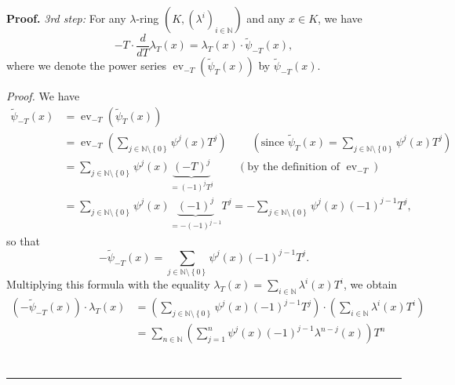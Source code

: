\documentclass[numbers=enddot,12pt,final,onecolumn,notitlepage]{scrartcl}%
\newenvironment{proof}[1][Proof]{\noindent\textbf{#1.} }{\ \rule{0.5em}{0.5em}}
\begin{document}
\begin{proof}
\textit{3rd step:} For any $\lambda$-ring $\left(  K,\left(  \lambda
^{i}\right)  _{i\in\mathbb{N}}\right)  $ and any $x\in K$, we have%
\[
-T\cdot\dfrac{d}{dT}\lambda_{T}\left(  x\right)  =\lambda_{T}\left(  x\right)
\cdot\widetilde{\psi}_{-T}\left(  x\right)  ,
\]
where we denote the power series $\operatorname*{ev}\nolimits_{-T}\left(
\widetilde{\psi}_{T}\left(  x\right)  \right)  $ by $\widetilde{\psi}%
_{-T}\left(  x\right)  $.

\textit{Proof.} We have
\begin{align*}
\widetilde{\psi}_{-T}\left(  x\right)   &  =\operatorname*{ev}\nolimits_{-T}%
\left(  \widetilde{\psi}_{T}\left(  x\right)  \right) \\
&  =\operatorname*{ev}\nolimits_{-T}\left(  \sum\limits_{j\in\mathbb{N}%
\setminus\left\{  0\right\}  }\psi^{j}\left(  x\right)  T^{j}\right)
\ \ \ \ \ \ \ \ \ \ \left(  \text{since }\widetilde{\psi}_{T}\left(  x\right)
=\sum\limits_{j\in\mathbb{N}\setminus\left\{  0\right\}  }\psi^{j}\left(
x\right)  T^{j}\right) \\
&  =\sum\limits_{j\in\mathbb{N}\setminus\left\{  0\right\}  }\psi^{j}\left(
x\right)  \underbrace{\left(  -T\right)  ^{j}}_{=\left(  -1\right)  ^{j}T^{j}%
}\ \ \ \ \ \ \ \ \ \ \left(  \text{by the definition of }\operatorname*{ev}%
\nolimits_{-T}\right) \\
&  =\sum\limits_{j\in\mathbb{N}\setminus\left\{  0\right\}  }\psi^{j}\left(
x\right)  \underbrace{\left(  -1\right)  ^{j}}_{=-\left(  -1\right)  ^{j-1}%
}T^{j}=-\sum\limits_{j\in\mathbb{N}\setminus\left\{  0\right\}  }\psi
^{j}\left(  x\right)  \left(  -1\right)  ^{j-1}T^{j},
\end{align*}
so that%
\[
-\widetilde{\psi}_{-T}\left(  x\right)  =\sum\limits_{j\in\mathbb{N}%
\setminus\left\{  0\right\}  }\psi^{j}\left(  x\right)  \left(  -1\right)
^{j-1}T^{j}.
\]
Multiplying this formula with the equality $\lambda_{T}\left(  x\right)
=\sum\limits_{i\in\mathbb{N}}\lambda^{i}\left(  x\right)  T^{i}$, we obtain%
\begin{align*}
\left(  -\widetilde{\psi}_{-T}\left(  x\right)  \right)  \cdot\lambda
_{T}\left(  x\right)   &  =\left(  \sum\limits_{j\in\mathbb{N}\setminus
\left\{  0\right\}  }\psi^{j}\left(  x\right)  \left(  -1\right)  ^{j-1}%
T^{j}\right)  \cdot\left(  \sum\limits_{i\in\mathbb{N}}\lambda^{i}\left(
x\right)  T^{i}\right) \\
&  =\sum_{n\in\mathbb{N}}\left(  \sum_{j=1}^{n}\psi^{j}\left(  x\right)
\left(  -1\right)  ^{j-1}\lambda^{n-j}\left(  x\right)  \right)  T^{n}\\

\end{align*}
\end{proof}
\end{document}

